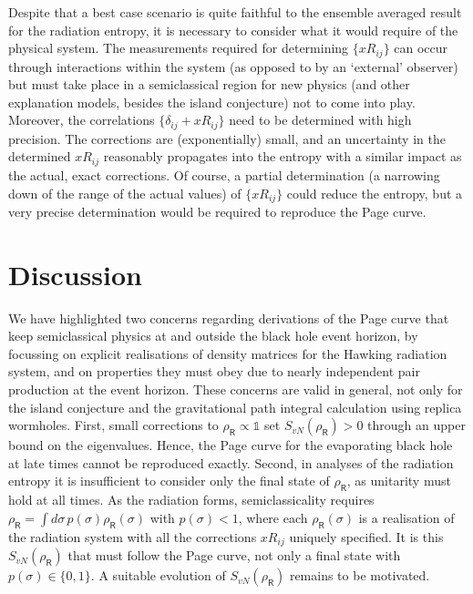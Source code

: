\documentclass[11pt]{article}
\numberwithin{equation}{section}
\begin{document}
Despite that a best case scenario is quite faithful to the ensemble averaged result for the radiation entropy, it is necessary to consider what it would require of the physical system. The measurements required for determining $\{xR_{ij}\}$ can occur through interactions within the system (as opposed to by an `external' observer) but must take place in a semiclassical region for new physics (and other explanation models, besides the island conjecture) not to come into play. Moreover, the correlations $\{\delta_{ij}+xR_{ij}\}$ need to be determined with high precision. The corrections are (exponentially) small, and an uncertainty in the determined $xR_{ij}$ reasonably propagates into the entropy with a similar impact as the actual, exact corrections. Of course, a partial determination (a narrowing down of the range of the actual values) of $\{xR_{ij}\}$ could reduce the entropy, but a very precise determination would be required to reproduce the Page curve.

\section{Discussion}\label{s.disc}
We have highlighted two concerns regarding derivations of the Page curve that keep semiclassical physics at and outside the black hole event horizon, by focussing on explicit realisations of density matrices for the Hawking radiation system, and on properties they must obey due to nearly independent pair production at the event horizon. These concerns are valid in general, not only for the island conjecture and the gravitational path integral calculation using replica wormholes. First, small corrections to $\rho_\textsf{R}\propto\mathbb{1}$ set $S_{vN}(\rho_\textsf{R})>0$ through an upper bound on the eigenvalues. Hence, the Page curve for the evaporating black hole at late times cannot be reproduced exactly. Second, in analyses of the radiation entropy it is insufficient to consider only the final state of $\rho_\textsf{R}$, as unitarity must hold at all times. As the radiation forms, semiclassicality requires $\rho_\textsf{R}=\int d\sigma\, p(\sigma)\rho_\textsf{R}(\sigma)$ with $p(\sigma)<1$, where each $\rho_\textsf{R}(\sigma)$ is a realisation of the radiation system with all the corrections $xR_{ij}$ uniquely specified. It is this $S_{vN}(\rho_\textsf{R})$ that must follow the Page curve, not only a final state with $p(\sigma)\in\{0,1\}$. A suitable evolution of $S_{vN}(\rho_\textsf{R})$ remains to be motivated.
\end{document}
